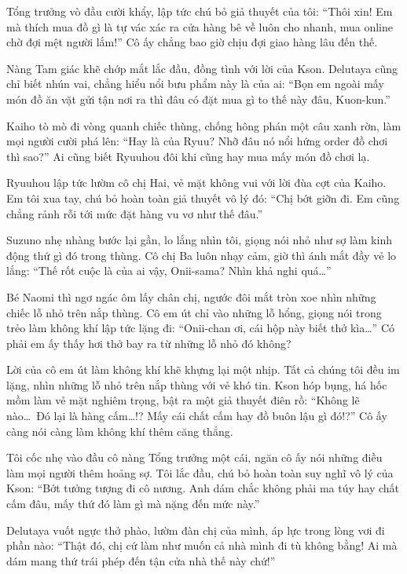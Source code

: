 ﻿\documentclass[../main.tex]{subfiles}
\begin{document}
Tổng trưởng vò đầu cười khẩy, lập tức chú bỏ giả thuyết của tôi: ``Thôi xin! Em mà thích mua đồ gì là tự vác xác ra cửa hàng bê về luôn cho nhanh, mua online chờ đợi mệt người lắm!'' Cô ấy chẳng bao giờ chịu đợi giao hàng lâu đến thế.

Nàng Tam giác khẽ chớp mắt lắc đầu, đồng tình với lời của Kson. Delutaya cũng chỉ biết nhún vai, chẳng hiểu nổi bưu phẩm này là của ai: ``Bọn em ngoài mấy món đồ ăn vặt gửi tận nơi ra thì đâu có đặt mua gì to thế này đâu, Kuon-kun.''

Kaiho tò mò đi vòng quanh chiếc thùng, chống hông phán một câu xanh rờn, làm mọi người cười phá lên: ``Hay là của Ryuu? Nhỡ đâu nó nổi hứng order đồ chơi thì sao?'' Ai cũng biết Ryuuhou đôi khi cũng hay mua mấy món đồ chơi lạ.

Ryuuhou lập tức lườm cô chị Hai, vẻ mặt không vui với lời đùa cợt của Kaiho. Em tôi xua tay, chú bỏ hoàn toàn giả thuyết vô lý đó: ``Chị bớt giỡn đi. Em cũng chẳng rảnh rỗi tới mức đặt hàng vu vơ như thế đâu.''

Suzuno nhẹ nhàng bước lại gần, lo lắng nhìn tôi, giọng nói nhỏ như sợ làm kinh động thứ gì đó trong thùng. Cô chị Ba luôn nhạy cảm, giờ thì ánh mắt đầy vẻ lo lắng: ``Thế rốt cuộc là của ai vậy, Onii-sama? Nhìn khả nghi quá\dots''

Bé Naomi thì ngơ ngác ôm lấy chân chị, ngước đôi mắt tròn xoe nhìn những chiếc lỗ nhỏ trên nắp thùng. Cô em út chỉ vào những lỗ hổng, giọng nói trong trẻo làm không khí lập tức lặng đi: ``Onii-chan ơi, cái hộp này biết thở kìa\dots'' Có phải em ấy thấy hơi thở bay ra từ những lỗ nhỏ đó không?

Lời của cô em út làm không khí khẽ khựng lại một nhịp. Tất cả chúng tôi đều im lặng, nhìn những lỗ nhỏ trên nắp thùng với vẻ khó tin. Kson hóp bụng, há hốc mồm làm vẻ mặt nghiêm trọng, bật ra một giả thuyết điên rồ: ``Không lẽ nào\dots\ Đó lại là hàng cấm\dots!? Mấy cái chất cấm hay đồ buôn lậu gì đó!?'' Cô ấy càng nói càng làm không khí thêm căng thẳng.

Tôi cốc nhẹ vào đầu cô nàng Tổng trưởng một cái, ngăn cô ấy nói những điều làm mọi người thêm hoảng sợ. Tôi lắc đầu, chú bỏ hoàn toàn suy nghĩ vô lý của Kson: ``Bớt tưởng tượng đi cô nương. Anh dám chắc không phải ma túy hay chất cấm đâu, mấy thứ đó làm gì mà nặng đến mức này.''

Delutaya vuốt ngực thở phào, lườm đàn chị của mình, áp lực trong lòng vơi đi phần nào: ``Thật đó, chị cứ làm như muốn cả nhà mình đi tù không bằng! Ai mà dám mang thứ trái phép đến tận cửa nhà thế này chứ!''
\end{document}
